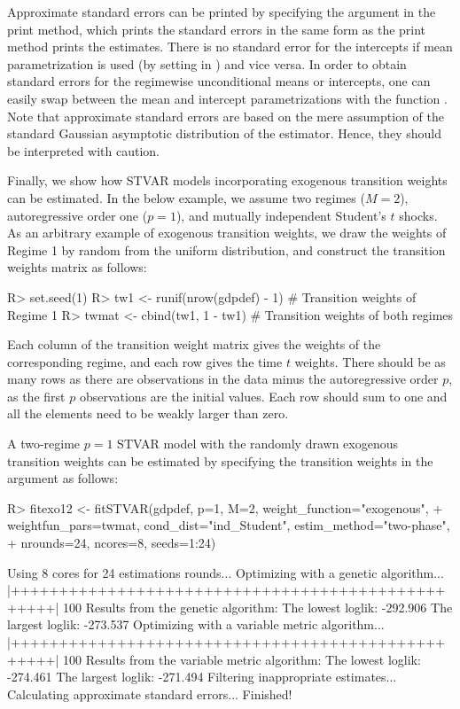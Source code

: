 \documentclass[nojss]{jss}
\begin{document}
Approximate standard errors can be printed by specifying the argument  in the print method, which prints the standard errors in the same form as the print method prints the estimates. There is no standard error for the intercepts if mean parametrization is used (by setting  in ) and vice versa. In order to obtain standard errors for the regimewise unconditional means or intercepts, one can easily swap between the mean and intercept parametrizations with the function . Note that approximate standard errors are based on the mere assumption of the standard Gaussian asymptotic distribution of the estimator. Hence, they should be interpreted with caution.

Finally, we show how STVAR models incorporating exogenous transition weights can be estimated. In the below example, we assume two regimes ($M=2$), autoregressive order one ($p=1$), and mutually independent Student's $t$ shocks. As an arbitrary example of exogenous transition weights, we draw the weights of Regime 1 by random from the uniform distribution, and construct the transition weights matrix as follows:
\begin{CodeChunk}
\begin{CodeInput}
R> set.seed(1)
R> tw1 <- runif(nrow(gdpdef) - 1) # Transition weights of Regime 1
R> twmat <- cbind(tw1, 1 - tw1) # Transition weights of both regimes
\end{CodeInput}
\end{CodeChunk}
Each column of the transition weight matrix gives the weights of the corresponding regime, and each row gives the time $t$ weights. There should be as many rows as there are observations in the data minus the autoregressive order $p$, as the first $p$ observations are the initial values. Each row should sum to one and all the elements need to be weakly larger than zero.

A two-regime $p=1$ STVAR model with the randomly drawn exogenous transition weights can be estimated by specifying the transition weights in the argument  as follows:
\begin{CodeChunk}
\begin{CodeInput}
R> fitexo12 <- fitSTVAR(gdpdef, p=1, M=2, weight_function="exogenous",
+    weightfun_pars=twmat, cond_dist="ind_Student", estim_method="two-phase",
+    nrounds=24, ncores=8, seeds=1:24)
\end{CodeInput}
\begin{CodeOutput}
Using 8 cores for 24 estimations rounds...
Optimizing with a genetic algorithm...
  |++++++++++++++++++++++++++++++++++++++++++++++++++| 100%
Results from the genetic algorithm:
The lowest loglik:  -292.906
The largest loglik: -273.537
Optimizing with a variable metric algorithm...
  |++++++++++++++++++++++++++++++++++++++++++++++++++| 100%
Results from the variable metric algorithm:
The lowest loglik:  -274.461
The largest loglik: -271.494
Filtering inappropriate estimates...
Calculating approximate standard errors...
Finished!
\end{CodeOutput}
\end{CodeChunk}
\end{document}
